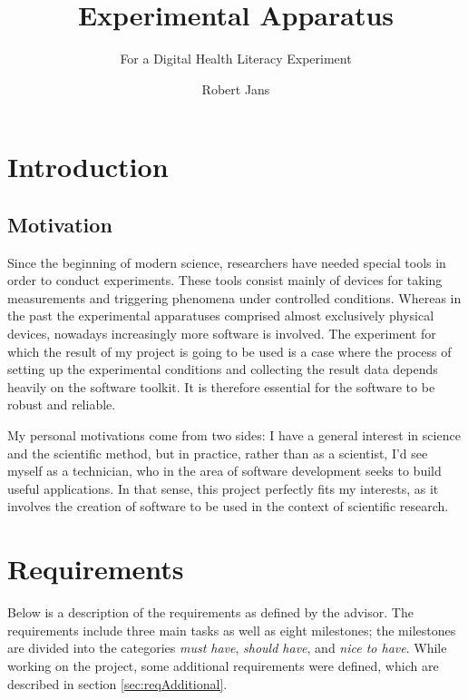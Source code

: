 \documentclass[a4paper]{usiinfbachelorproject}
\author{Robert Jans}
\title{\textbf{Experimental Apparatus}}
\subtitle{For a Digital Health Literacy Experiment}
\begin{document}
\maketitle
\tableofcontents\newpage
\listoffigures\newpage

\section{\textbf{Introduction}}

\subsection{\textbf{Motivation}}

Since the beginning of modern science, researchers have needed special tools in order to conduct experiments. These tools consist 
mainly of devices for taking measurements and triggering phenomena under controlled conditions. Whereas in the past the
experimental apparatuses comprised almost exclusively physical devices, nowadays increasingly more software is involved.
The experiment for which the result of my project is going to be used is a case where the process of 
setting up the experimental conditions and collecting the result data depends heavily on the software toolkit. It is therefore
essential for the software to be robust and reliable.

My personal motivations come from two sides: I have a general interest in science and the scientific method, but in practice,
rather than as a scientist,
I'd see myself as a technician, who in the area of software development seeks to build useful applications.
In that sense, this project perfectly fits my interests, as it involves the creation of software to be used in the context of
scientific research.    


\section{\textbf{Requirements}} \label{sec:req}

Below is a description of the requirements as defined by the advisor. The requirements include three main tasks as well 
as eight milestones; the milestones are divided into the categories \emph{must have}, \emph{should have}, and \emph{nice to have}.
While working on the project, some additional requirements were defined, which are described in section 
\ref{sec:reqAdditional}.
\end{document}
